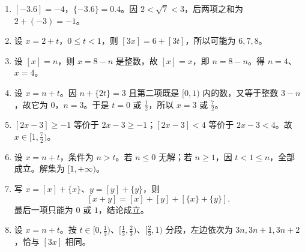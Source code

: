 \documentclass[11pt,a4paper,fontset=fandol]{ctexart}
\begin{document}
\begin{enumerate}
\item\begin{testsolution}$[-3.6]=-4$，$\{-3.6\}=0.4$。因 $2<\sqrt7<3$，后两项之和为 $2+(-3)=-1$。\end{testsolution}
\item\begin{testsolution}设 $x=2+t$，$0\le t<1$，则 $[3x]=6+[3t]$，所以可能为 $6,7,8$。\end{testsolution}
\item\begin{testsolution}设 $[x]=n$，则 $x=8-n$ 是整数，故 $[x]=x$，即 $n=8-n$。得 $n=4$、$x=4$。\end{testsolution}
\item\begin{testsolution}设 $x=n+t$。因 $n+\{2t\}=3$ 且第二项既是 $[0,1)$ 内的数，又等于整数 $3-n$，故它为 $0$，$n=3$。于是 $t=0$ 或 $\frac12$，所以 $x=3$ 或 $\frac72$。\end{testsolution}
\item\begin{testsolution}$[2x-3]\ge-1$ 等价于 $2x-3\ge-1$；$[2x-3]<4$ 等价于 $2x-3<4$。故 $x\in[1,\frac72)$。\end{testsolution}
\item\begin{testsolution}设 $x=n+t$，条件为 $n>t$。若 $n\le0$ 无解；若 $n\ge1$，因 $t<1\le n$，全部成立。解集为 $[1,+\infty)$。\end{testsolution}
\item\begin{testsolution}写 $x=[x]+\{x\}$、$y=[y]+\{y\}$，则
\[
[x+y]=[x]+[y]+[\{x\}+\{y\}].
\]
最后一项只能为 $0$ 或 $1$，结论成立。\end{testsolution}
\item\begin{testsolution}设 $x=n+t$。按 $t\in[0,\frac13)$、$[\frac13,\frac23)$、$[\frac23,1)$ 分段，左边依次为 $3n,3n+1,3n+2$，恰与 $[3x]$ 相同。\end{testsolution}
\end{enumerate}
\end{document}
